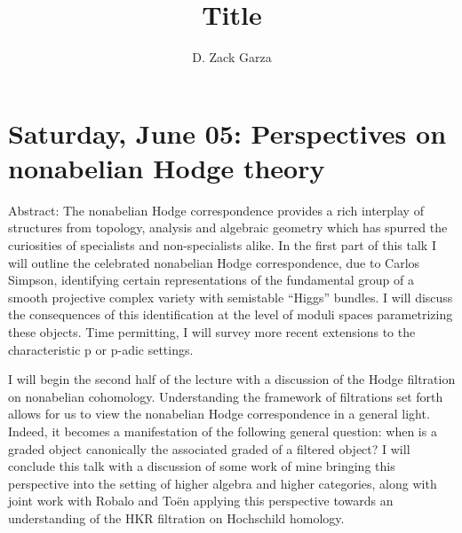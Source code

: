 


\let\Begin\begin
\let\End\end
\newcommand\wrapenv[1]{#1}

\makeatletter
\def\ScaleWidthIfNeeded{%
 \ifdim\Gin@nat@width>\linewidth
    \linewidth
  \else
    \Gin@nat@width
  \fi
}
\def\ScaleHeightIfNeeded{%
  \ifdim\Gin@nat@height>0.9\textheight
    0.9\textheight
  \else
    \Gin@nat@width
  \fi
}
\makeatother

\setkeys{Gin}{width=\ScaleWidthIfNeeded,height=\ScaleHeightIfNeeded,keepaspectratio}%

\title{
\textbf{
    Title
  }
  }









\date{}
\author{D. Zack Garza}
\maketitle


\newpage

\tableofcontents
\newpage

\hypertarget{saturday-june-05-perspectives-on-nonabelian-hodge-theory}{%
\section{Saturday, June 05: Perspectives on nonabelian Hodge
theory}\label{saturday-june-05-perspectives-on-nonabelian-hodge-theory}}

\begin{remark}

Abstract: The nonabelian Hodge correspondence provides a rich interplay
of structures from topology, analysis and algebraic geometry which has
spurred the curiosities of specialists and non-specialists alike. In the
first part of this talk I will outline the celebrated nonabelian Hodge
correspondence, due to Carlos Simpson, identifying certain
representations of the fundamental group of a smooth projective complex
variety with semistable ``Higgs'' bundles. I will discuss the
consequences of this identification at the level of moduli spaces
parametrizing these objects. Time permitting, I will survey more recent
extensions to the characteristic p or p-adic settings.

I will begin the second half of the lecture with a discussion of the
Hodge filtration on nonabelian cohomology. Understanding the framework
of filtrations set forth allows for us to view the nonabelian Hodge
correspondence in a general light. Indeed, it becomes a manifestation of
the following general question: when is a graded object canonically the
associated graded of a filtered object? I will conclude this talk with a
discussion of some work of mine bringing this perspective into the
setting of higher algebra and higher categories, along with joint work
with Robalo and Toën applying this perspective towards an understanding
of the HKR filtration on Hochschild homology.

\end{remark}

